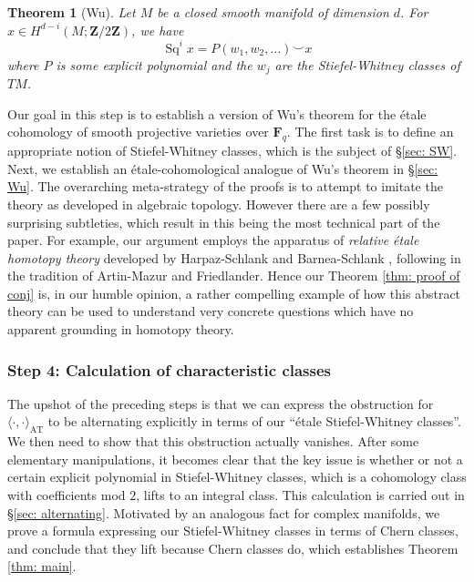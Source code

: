 \documentclass[10pt, reqno]{amsart}
\numberwithin{equation}{subsection}
\newcommand{\F}{\mathbf{F}}
\newcommand{\Z}{\mathbf{Z}}
\newcommand{\mrm}[1]{\mathrm{#1}}
\DeclareMathOperator{\Sq}{Sq}
\newtheorem{thm}{Theorem}[section]
\theoremstyle{remark}
\begin{document}
\begin{thm}[Wu]
Let $M$ be a closed smooth manifold of dimension $d$. For $x \in H^{d-i}(M; \Z/2\Z)$, we have
\[
\Sq^i x = P(w_1, w_2, \ldots) \smile x
\]
where $P$ is some explicit polynomial and the $w_j$ are the Stiefel-Whitney classes of $TM$.
\end{thm}

Our goal in this step is to establish a version of Wu's theorem for the \'{e}tale cohomology of smooth projective varieties over $\F_q$. The first task is to define an appropriate notion of Stiefel-Whitney classes, which is the subject of \S \ref{sec: SW}. Next, we establish an \'{e}tale-cohomological analogue of Wu's theorem in \S \ref{sec: Wu}. The overarching meta-strategy of the proofs is to attempt to imitate the theory as developed in algebraic topology. However there are a few possibly surprising subtleties, which result in this being the most technical part of the paper. For example, our argument employs the apparatus of \emph{relative \'{e}tale homotopy theory} developed by Harpaz-Schlank \cite{HS} and Barnea-Schlank \cite{BS}, following in the tradition of Artin-Mazur and Friedlander. Hence our Theorem \ref{thm: proof of conj} is, in our humble opinion, a rather compelling example of how this abstract theory can be used to understand very concrete questions which have no apparent grounding in homotopy theory. 


\subsubsection*{Step 4: Calculation of characteristic classes} 


The upshot of the preceding steps is that we can express the obstruction for $\langle  \cdot, \cdot \rangle_{\mrm{AT}}  $ to be alternating explicitly in terms of our ``\'{e}tale Stiefel-Whitney classes''. We then need to show that this obstruction actually vanishes. After some elementary manipulations, it becomes clear that the key issue is whether or not a certain explicit polynomial in Stiefel-Whitney classes, which is a cohomology class with coefficients mod $2$, lifts to an integral class. This calculation is carried out in \S \ref{sec: alternating}. Motivated by an analogous fact for complex manifolds, we prove a formula expressing our Stiefel-Whitney classes in terms of Chern classes, and conclude that they lift because Chern classes do, which establishes Theorem \ref{thm: main}.
\end{document}
